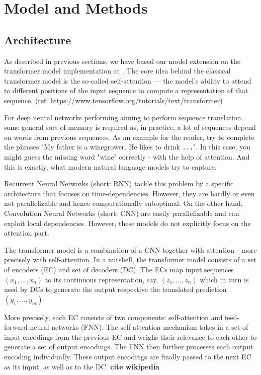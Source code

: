 \documentclass[11pt,a4paper]{article}
\begin{document}
\section{Model and Methods}
\subsection{Architecture}
As described in previous sections, we have based our model extension on the transformer model implementation at . The core idea behind the classical transformer model is the so-called self-attention — the model's ability to attend to different positions of the input sequence to compute a representation of that sequence. (ref: https://www.tensorflow.org/tutorials/text/transformer)

For deep neural networks performing aiming to perform sequence translation, some general sort of memory is required as, in practice, a lot of sequences depend on words from previous sequences. As an example for the reader, try to complete the phrases "My father is a winegrower. He likes to drink {\tt ...}". In this case, you might guess the missing word "wine" correctly - with the help of attention. And this is exactly, what modern natural language models try to capture.

Recurrent Neural Networks (short: RNN) tackle this problem by a specific architecture that focuses on time-dependencies. However, they are hardly or even not parallelizable and hence computationally suboptimal. 
On the other hand, Convolution Neural Networks (short: CNN) are easily parallelizable and can exploit local dependencies. However, these models do not explicitly focus on the attention part. 

The transformer model is a combination of a CNN together with attention - more precisely with self-attention. In a nutshell, the transformer model consists of a set of encoders (EC) and set of decoders (DC). The ECs map input sequences $(x_1,...,x_n)$ to its continuous representation, say, $(z_1,...,z_n)$ which in turn is used by DCs to generate the output respective the translated prediction $(y_1,...,y_m)$.

More precisely, each EC consists of two components: self-attention and feed-forward neural networks (FNN). The self-attention mechanism takes in a set of input encodings from the previous EC and weighs their relevance to each other to generate a set of output encodings. The FNN then further processes each output encoding individually. These output encodings are finally passed to the next EC as its input, as well as to the DC. \textbf{cite wikipedia}
\end{document}
